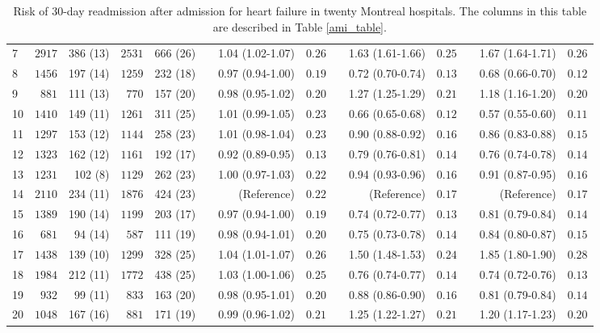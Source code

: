 \documentclass[]{article}\usepackage[]{graphicx}\usepackage[]{color}
\begin{document}
\begin{landscape}
\begin{table}[!tbp]
\begin{center}
\begin{tabular}{lrrrrcrrcrrcrr}
7&$2917$&386 (13)&$2531$&666 (26)&&1.04 (1.02-1.07)&$0.26$&&1.63 (1.61-1.66)&$0.25$&&1.67 (1.64-1.71)&$0.26$\tabularnewline
8&$1456$&197 (14)&$1259$&232 (18)&&0.97 (0.94-1.00)&$0.19$&&0.72 (0.70-0.74)&$0.13$&&0.68 (0.66-0.70)&$0.12$\tabularnewline
9&$ 881$&111 (13)&$ 770$&157 (20)&&0.98 (0.95-1.02)&$0.20$&&1.27 (1.25-1.29)&$0.21$&&1.18 (1.16-1.20)&$0.20$\tabularnewline
10&$1410$&149 (11)&$1261$&311 (25)&&1.01 (0.99-1.05)&$0.23$&&0.66 (0.65-0.68)&$0.12$&&0.57 (0.55-0.60)&$0.11$\tabularnewline
11&$1297$&153 (12)&$1144$&258 (23)&&1.01 (0.98-1.04)&$0.23$&&0.90 (0.88-0.92)&$0.16$&&0.86 (0.83-0.88)&$0.15$\tabularnewline
12&$1323$&162 (12)&$1161$&192 (17)&&0.92 (0.89-0.95)&$0.13$&&0.79 (0.76-0.81)&$0.14$&&0.76 (0.74-0.78)&$0.14$\tabularnewline
13&$1231$&102 (8)&$1129$&262 (23)&&1.00 (0.97-1.03)&$0.22$&&0.94 (0.93-0.96)&$0.16$&&0.91 (0.87-0.95)&$0.16$\tabularnewline
14&$2110$&234 (11)&$1876$&424 (23)&&(Reference)&$0.22$&&(Reference)&$0.17$&&(Reference)&$0.17$\tabularnewline
15&$1389$&190 (14)&$1199$&203 (17)&&0.97 (0.94-1.00)&$0.19$&&0.74 (0.72-0.77)&$0.13$&&0.81 (0.79-0.84)&$0.14$\tabularnewline
16&$ 681$&94 (14)&$ 587$&111 (19)&&0.98 (0.94-1.01)&$0.20$&&0.75 (0.73-0.78)&$0.14$&&0.84 (0.80-0.87)&$0.15$\tabularnewline
17&$1438$&139 (10)&$1299$&328 (25)&&1.04 (1.01-1.07)&$0.26$&&1.50 (1.48-1.53)&$0.24$&&1.85 (1.80-1.90)&$0.28$\tabularnewline
18&$1984$&212 (11)&$1772$&438 (25)&&1.03 (1.00-1.06)&$0.25$&&0.76 (0.74-0.77)&$0.14$&&0.74 (0.72-0.76)&$0.13$\tabularnewline
19&$ 932$&99 (11)&$ 833$&163 (20)&&0.98 (0.95-1.01)&$0.20$&&0.88 (0.86-0.90)&$0.16$&&0.81 (0.79-0.84)&$0.14$\tabularnewline
20&$1048$&167 (16)&$ 881$&171 (19)&&0.99 (0.96-1.02)&$0.21$&&1.25 (1.22-1.27)&$0.21$&&1.20 (1.17-1.23)&$0.20$\tabularnewline
\hline
\end{tabular}

\caption{Risk of 30-day readmission after admission for  heart failure  in twenty Montreal hospitals.  The columns in this table are described in Table \ref{ami_table}.\label{heart_failure_table}}\end{center}


\end{table}
\end{landscape}
\end{document}
